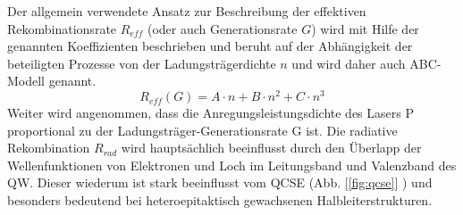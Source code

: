 Der allgemein verwendete Ansatz zur Beschreibung der effektiven Rekombinationsrate $R_{eff}$ (oder auch Generationsrate $G$) wird mit Hilfe der genannten Koeffizienten beschrieben und beruht auf der Abhängigkeit der beteiligten Prozesse von der Ladungsträgerdichte $n$ und wird daher auch ABC-Modell genannt.
\begin{equation}
    R_{eff} (G) = A \cdot n + B \cdot n^2 + C \cdot n^3 
    \label{eq:iqe2}
\end{equation}
Weiter wird angenommen, dass die Anregungsleistungsdichte des Lasers P proportional zu
der Ladungsträger-Generationsrate G ist. Die radiative Rekombination $R_{rad}$ wird hauptsächlich beeinflusst durch den Überlapp der Wellenfunktionen von Elektronen und Loch im Leitungsband und Valenzband des QW. Dieser wiederum ist stark beeinflusst vom QCSE (Abb. 
[\ref{fig:qcse}] ) und besonders bedeutend bei heteroepitaktisch gewachsenen Halbleiterstrukturen. 
%
